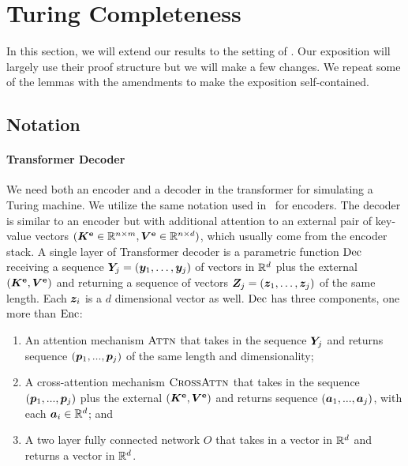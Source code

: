 \section{Turing Completeness}
\label{sec:apndx-turing}

In this section, we will extend our results to the setting of \citet{Perez19}. Our 
exposition will largely use their proof structure but we will make a few changes. 
We  repeat some of the lemmas with the amendments to make the exposition 
self-contained. 



\subsection{Notation}
\paragraph{Transformer Decoder}
We need both an encoder and a decoder in the transformer for simulating a Turing machine.
We utilize the same notation used in~ for encoders. 
The decoder is similar to an encoder but with additional attention to an external pair of key-value vectors $({\bm{K}}^{\textbf{e}}\in\mathbb{R}^{n\times m},{\bm{V}}^{\textbf{e}}\in\mathbb{R}^{n\times d})$, which usually come from the encoder stack.
A single layer of Transformer decoder is a parametric function $\operatorname{Dec}$ receiving a sequence ${\bm{Y}}_j=({\bm{y}}_1,\ldots, {\bm{y}}_j)$ of vectors in $\mathbb{R}^d$ plus the external $({\bm{K}}^{\textbf{e}}, {\bm{V}}^{\textbf{e}})$ and returning a sequence of vectors ${\bm{Z}}_j=({\bm{z}}_1,\ldots,{\bm{z}}_j)$ of the same length. Each ${\bm{z}}_i$ is a $d$ dimensional vector as well.  $\operatorname{Dec}$ has three components, one more than $\operatorname{Enc}$:
\begin{enumerate}[leftmargin=6mm, itemsep=2mm, partopsep=0pt,parsep=0pt]
    \item An attention mechanism $\textsc{Attn}$ that takes in the sequence ${\bm{Y}}_j$ and returns sequence $({\bm{p}}_1, ..., {\bm{p}}_j)$ of the same length and dimensionality;  
    \item A cross-attention mechanism $\textsc{CrossAttn}$ that takes in the sequence $({\bm{p}}_1, ..., {\bm{p}}_j)$ plus the external $({\bm{K}}^{\textbf{e}}, {\bm{V}}^{\textbf{e}})$ and returns sequence $({\bm{a}}_1, ..., {\bm{a}}_j)$, with each ${\bm{a}}_i\in\mathbb{R}^d$; and
    \item A two layer fully connected network $O$ that takes in a vector in $\mathbb{R}^d$ and returns a vector in $\mathbb{R}^d$. 
\end{enumerate}
\vspace{-2mm}
